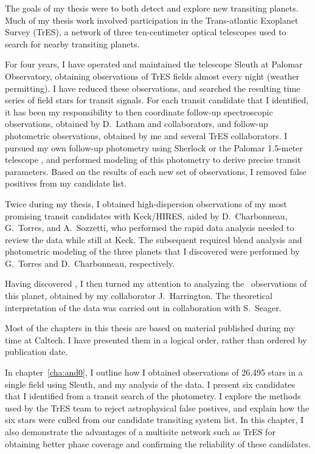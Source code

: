 The goals of my thesis were to both detect and explore new transiting planets.
Much of my thesis work involved participation in the Trans-atlantic Exoplanet Survey (TrES), a network of three ten-centimeter optical telescopes used to search for nearby transiting planets.

For four years, I have operated and maintained the telescope Sleuth at Palomar Observatory, obtaining observations of TrES fields almost every night (weather permitting). 
I have reduced these observations, and searched the resulting time series of field stars for transit signals. 
For each transit candidate that I identified, it has been my responsibility to then coordinate follow-up spectroscopic observations, obtained by D.~Latham and collaborators, and follow-up photometric observations, obtained by me and several TrES collaborators. 
I pursued my own follow-up photometry using Sherlock \citep{Kotredes_Charbonneau_Looper:2004a} or the Palomar 1.5-meter telescope \citep[see, e.g.,][for an example of the 1.5-meter photometry]{Holman_Winn_Latham:apj:2006a}, and performed modeling of this photometry to derive precise transit parameters.
Based on the results of each new set of observations, I removed false positives from my candidate list. 

Twice during my thesis, I obtained high-dispersion observations of my most promising transit candidates with Keck/HIRES, aided by D.~Charbonneau, G.~Torres, and A.~Sozzetti, who performed the rapid data analysis needed to review the data while still at Keck. 
The subsequent required blend analysis and photometric modeling of the three planets that I discovered were performed by G.~Torres and D.~Charbonneau, respectively.

Having discovered \tresTwo, I then turned my attention to analyzing the \spi\ observations of this planet, obtained by my collaborator J.~Harrington.
The theoretical interpretation of the data was carried out in collaboration with S.~Seager.

Most of the chapters in this thesis are based on material published during my time at Caltech. 
I have presented them in a logical order, rather than ordered by publication date. 

In chapter~\ref{cha:and0}, I outline how I obtained observations of 26,495 stars in a single field using Sleuth, and my analysis of the data. 
I present six candidates that I identified from a transit search of the photometry.
I explore the methods used by the TrES team to reject astrophysical false postives, and explain how the six stars were culled from our candidate transiting system list. 
In this chapter, I also demonstrate the advantages of a multisite network such as TrES for obtaining better phase coverage and confirming the reliability of these candidates. 

